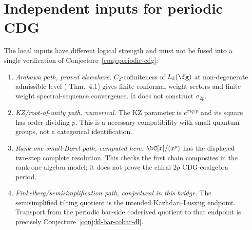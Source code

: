 \section{Independent inputs for periodic CDG}
\label{sec:periodic-cdg-verification}

\begin{remark}
\label{rem:periodic-cdg-multipath}
The local inputs have different logical strength and must not be fused into a
single verification of Conjecture~\ref{conj:periodic-cdg}:
\begin{enumerate}[label=\textup{(P\arabic*)}]
\item \emph{Arakawa path, proved elsewhere.} $C_2$-cofiniteness of
 $L_k(\fg)$ at
 non-degenerate admissible level
 \textup{(}\cite{Arakawa15} Thm.~4.1\textup{)} gives finite
 conformal-weight sectors and finite-weight spectral-sequence
 convergence.  It does not construct $\sigma_{2p}$.
\item \emph{KZ/root-of-unity path, numerical.} The KZ parameter is
 $e^{\pi i q/p}$ and its square has order dividing $p$.  This is a
 necessary compatibility with small quantum groups, not a categorical
 identification.
\item \emph{Rank-one small-Borel path, computed here.}
 $\bC[x]/(x^p)$ has the displayed two-step complete resolution.
 This checks the first chain composites in the rank-one algebra model;
 it does not prove the chiral $2p$ CDG-coalgebra period.
\item \emph{Finkelberg/semisimplification path, conjectural in this
 bridge.} The semisimplified tilting quotient is the intended
 Kazhdan--Lusztig endpoint.  Transport from the periodic bar-side
 coderived quotient to that endpoint is precisely
 Conjecture~\ref{conj:kl-bar-cobar-dl}.
\end{enumerate}
\end{remark}

\endinput
